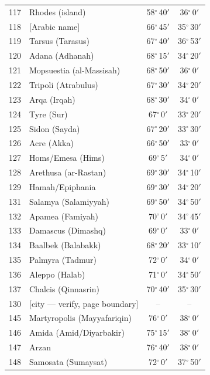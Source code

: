 \documentclass[10pt,a4paper]{article}
\begin{document}
\begin{longtable}{r >{\raggedright\arraybackslash}p{8.5cm} c c}
117 & Rhodes (island) & 58$^\circ$\,40$'$ & 36$^\circ$\,0$'$\\
118 & {[}Arabic name{]} & 66$^\circ$\,45$'$ & 35$^\circ$\,30$'$\\
119 & Tarsus (Tarasus) & 67$^\circ$\,40$'$ & 36$^\circ$\,53$'$\\
120 & Adana (Adhanah) & 68$^\circ$\,15$'$ & 34$^\circ$\,20$'$\\
121 & Mopsuestia (al-Massisah) & 68$^\circ$\,50$'$ & 36$^\circ$\,0$'$\\
122 & Tripoli (Atrabulus) & 67$^\circ$\,30$'$ & 34$^\circ$\,20$'$\\
123 & Arqa (Irqah) & 68$^\circ$\,30$'$ & 34$^\circ$\,0$'$\\
124 & Tyre (Sur) & 67$^\circ$\,0$'$ & 33$^\circ$\,20$'$\\
125 & Sidon (Sayda) & 67$^\circ$\,20$'$ & 33$^\circ$\,30$'$\\
126 & Acre (Akka) & 66$^\circ$\,50$'$ & 33$^\circ$\,0$'$\\
127 & Homs/Emesa (Hims) & 69$^\circ$\,5$'$ & 34$^\circ$\,0$'$\\
128 & Arethusa (ar-Rastan) & 69$^\circ$\,30$'$ & 34$^\circ$\,10$'$\\
129 & Hamah/Epiphania & 69$^\circ$\,30$'$ & 34$^\circ$\,20$'$\\
131 & Salamya (Salamiyyah) & 69$^\circ$\,50$'$ & 34$^\circ$\,50$'$\\
132 & Apamea (Famiyah) & 70$^\circ$\,0$'$ & 34$^\circ$\,45$'$\\
133 & Damascus (Dimashq) & 69$^\circ$\,0$'$ & 33$^\circ$\,0$'$\\
134 & Baalbek (Balabakk) & 68$^\circ$\,20$'$ & 33$^\circ$\,10$'$\\
135 & Palmyra (Tadmur) & 72$^\circ$\,0$'$ & 34$^\circ$\,0$'$\\
136 & Aleppo (Halab) & 71$^\circ$\,0$'$ & 34$^\circ$\,50$'$\\
137 & Chalcis (Qinnasrin) & 70$^\circ$\,40$'$ & 35$^\circ$\,30$'$\\
130 & {[}city — verify, page boundary{]} & \textcolor{gray}{--} & \textcolor{gray}{--}\\
145 & Martyropolis (Mayyafariqin) & 76$^\circ$\,0$'$ & 38$^\circ$\,0$'$\\
146 & Amida (Amid/Diyarbakir) & 75$^\circ$\,15$'$ & 38$^\circ$\,0$'$\\
147 & Arzan & 76$^\circ$\,40$'$ & 38$^\circ$\,0$'$\\
148 & Samosata (Sumaysat) & 72$^\circ$\,0$'$ & 37$^\circ$\,50$'$\\

\end{longtable}
\end{document}
